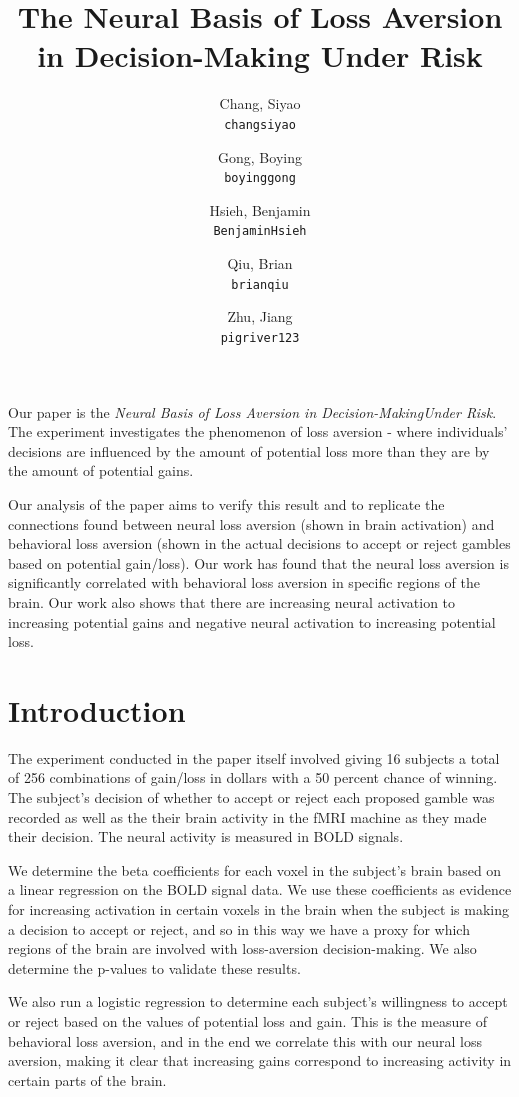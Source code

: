 \documentclass[11pt]{article}
\title{The Neural Basis of Loss Aversion in Decision-Making Under Risk}
\author{
  Chang, Siyao \\
  \texttt{changsiyao}
  \and
  Gong, Boying\\
  \texttt{boyinggong}
  \and
  Hsieh, Benjamin\\
  \texttt{BenjaminHsieh}
  \and
  Qiu, Brian\\
  \texttt{brianqiu}
  \and
  Zhu, Jiang\\
  \texttt{pigriver123}
}
\begin{document}
\maketitle

\par Our paper is the \textit{Neural Basis of Loss Aversion in Decision-MakingUnder Risk}.
The experiment investigates the 
phenomenon of loss aversion - where individuals' decisions are influenced by the
amount of potential loss more than they are by the amount of potential gains. 

\par 
Our analysis of the paper aims to verify this result and to replicate the connections found between neural loss aversion (shown in brain activation) and behavioral loss aversion (shown in the actual decisions to accept or reject gambles based on potential gain/loss). Our work has found that the neural loss aversion is significantly correlated with behavioral loss aversion in specific regions of the brain. Our work also shows that there are increasing neural activation to increasing potential gains and negative neural activation to increasing potential loss.

\section{Introduction}
The experiment conducted in the paper itself involved giving 16 subjects a total of 256 combinations of gain/loss in dollars with a 50 percent chance of winning. The subject's decision of whether to accept or reject each proposed gamble was recorded as well as the their brain activity in the fMRI machine as they made their decision. The neural activity is measured in BOLD signals.

\par 
We determine the beta coefficients for each voxel in the subject's brain based on a linear regression on the BOLD signal data. We use these coefficients as evidence for increasing activation in certain voxels in the brain when the subject is making a decision to accept or reject, and so in this way we have a proxy for which regions of the brain are involved with loss-aversion decision-making. We also determine the p-values to validate these results.

\par 
We also run a logistic regression to determine each subject's willingness to accept or reject based on the values of potential loss and gain. This is the measure of behavioral loss aversion, and in the end we correlate this with our neural loss aversion, making it clear that increasing gains correspond to increasing activity in certain parts of the brain.  
\end{document}
